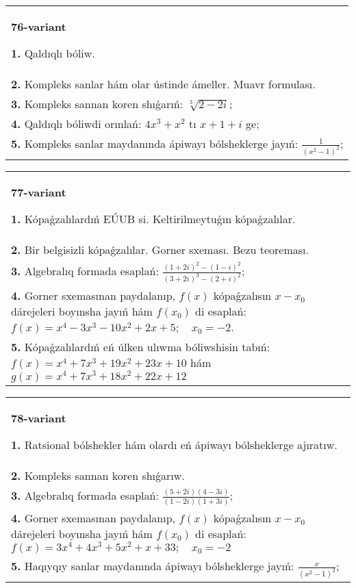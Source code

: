 \documentclass{article}
\begin{document}
\begin{tabular}{m{17cm}}
\textbf{76-variant}
\newline

\textbf{1.} Qaldıqlı bóliw.  \\
\textbf{2.} Kompleks sanlar hám olar ústinde ámeller. Muavr formulası.  \\
\textbf{3.} Kompleks sannan koren shıǵarıń: $\sqrt[3]{2-2 i}$; \\
\textbf{4.} Qaldıqlı bóliwdi orınlań: $4 x^3+x^2$ tı $x+1+i$ ge; \\
\textbf{5.} Kompleks sanlar maydanında ápiwayı bólsheklerge jayıń: $\frac{1}{\left(x^2-1\right)^2}$; \\

\end{tabular}
\vspace{1cm}


\begin{tabular}{m{17cm}}
\textbf{77-variant}
\newline

\textbf{1.} Kópaǵzalılardıń EÚUB si. Keltirilmeytuǵın   kópaǵzalılar. \\
\textbf{2.} Bir belgisizli kópaǵzalılar. Gorner sxeması. Bezu teoreması.  \\
\textbf{3.} Algebralıq formada esaplań:  $\frac{(1+2 i)^2-(1-i)^2}{(3+2 i)^3-(2+i)^2}$; \\
\textbf{4.} Gorner sxemasınan paydalanıp, $f(x)$ kópaǵzalısın $x-x_0$ dárejeleri boyınsha jayıń hám $f\left(x_0\right)$ di esaplań: $f(x)=x^4-3 x^3-10 x^2+2 x+5 ; \quad x_0=-2$. \\
\textbf{5.} Kópaǵzalılardıń eń úlken ulıwma bóliwshisin tabıń:  $f(x)=x^4+7 x^3+19 x^2+23 x+10$ hám $g(x)=x^4+7 x^3+18 x^2+22 x+12$ \\

\end{tabular}
\vspace{1cm}


\begin{tabular}{m{17cm}}
\textbf{78-variant}
\newline

\textbf{1.} Ratsional bólshekler hám olardı eń ápiwayı bólsheklerge ajıratıw. \\
\textbf{2.} Kompleks sannan koren shıǵarıw. \\
\textbf{3.} Algebralıq formada esaplań: $\frac{(5+2 i)(4-3 i)}{(1-2 i)(1+3 i)}$; \\
\textbf{4.} Gorner sxemasınan paydalanıp, $f(x)$ kópaǵzalısın $x-x_0$ dárejeleri boyınsha jayıń hám $f\left(x_0\right)$ di esaplań: $f(x)=3 x^4+4 x^3+5 x^2+x+33 ; \quad x_0=-2$ \\
\textbf{5.} Haqıyqıy sanlar maydanında ápiwayı bólsheklerge jayıń:  $\frac{x}{\left(x^2-1\right)^2}$; \\

\end{tabular}
\vspace{1cm}
\end{document}
